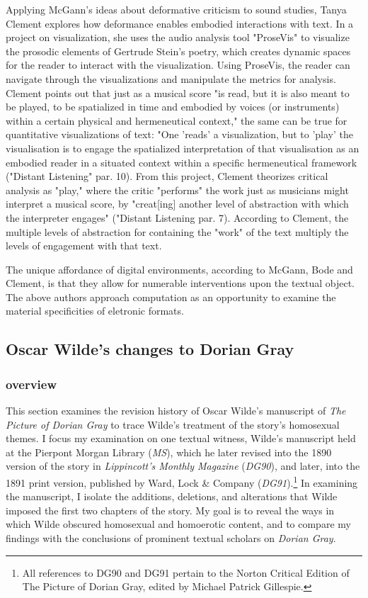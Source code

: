 \documentclass[11pt]{article}
\begin{document}
Applying McGann's ideas about deformative criticism to sound studies,
Tanya Clement explores how deformance enables embodied interactions
with text. In a project on visualization, she uses the audio analysis
tool "ProseVis" to visualize the prosodic elements of Gertrude Stein's
poetry, which creates dynamic spaces for the reader to interact with
the visualization. Using ProseVis, the reader can navigate through the
visualizations and manipulate the metrics for analysis. Clement points
out that just as a musical score "is read, but it is also meant to be
played, to be spatialized in time and embodied by voices (or
instruments) within a certain physical and hermeneutical context," the
same can be true for quantitative visualizations of text: "One 'reads'
a visualization, but to 'play' the visualisation is to engage the
spatialized interpretation of that visualisation as an embodied reader
in a situated context within a specific hermeneutical framework
("Distant Listening" par. 10). From this project, Clement theorizes
critical analysis as "play," where the critic "performs" the work just
as musicians might interpret a musical score, by "creat[ing] another
level of abstraction with which the interpreter engages" ("Distant
Listening par. 7). According to Clement, the multiple levels of
abstraction for containing the "work" of the text multiply the levels
of engagement with that text.

The unique affordance of digital environments, according to McGann,
Bode and Clement, is that they allow for numerable interventions upon
the textual object. The above authors approach computation as an
opportunity to examine the material specificities of eletronic
formats.

\subsection{Oscar Wilde's changes to Dorian Gray}
\label{sec:org0e8bd27}
\subsubsection{overview}
\label{sec:org258c389}
This section examines the revision history of Oscar Wilde’s manuscript
of \emph{The Picture of Dorian Gray} to trace Wilde's treatment of the
story’s homosexual themes. I focus my examination on one textual
witness, Wilde’s manuscript held at the Pierpont Morgan Library
(\emph{MS}), which he later revised into the 1890 version of the story in
\emph{Lippincott’s Monthly Magazine} (\emph{DG90}), and later, into the 1891
print version, published by Ward, Lock \& Company (\emph{DG91}).\footnote{All references to DG90 and DG91 pertain to the Norton Critical
Edition of The Picture of Dorian Gray, edited by Michael Patrick
Gillespie.} In
examining the manuscript, I isolate the additions, deletions, and
alterations that Wilde imposed the first two chapters of the story. My
goal is to reveal the ways in which Wilde obscured homosexual and
homoerotic content, and to compare my findings with the conclusions of
prominent textual scholars on \emph{Dorian Gray}.
\end{document}
